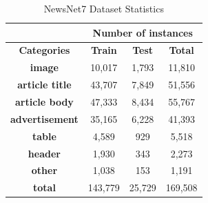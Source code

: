 \documentclass[letterpaper]{article} %
\begin{document}
\begin{table}[h]
\centering
\small
\captionsetup{font=small}
\label{NewsNet7_data_stats}

\begin{tabular}{c|ccc}
\toprule
\multicolumn{1}{l}{}   & \multicolumn{3}{c}{\textbf{Number of instances}} \\ \hline
\textbf{Categories}    & \textbf{Train}  & \textbf{Test} & \textbf{Total} \\ \hline
\textbf{image}         & 10,017           & 1,793          & 11,810          \\
\textbf{article title} & 43,707           & 7,849          & 51,556          \\
\textbf{article body}  & 47,333           & 8,434          & 55,767          \\
\textbf{advertisement} & 35,165           & 6,228          & 41,393          \\
\textbf{table}         & 4,589            & 929            & 5,518           \\
\textbf{header}        & 1,930            & 343            & 2,273           \\
\textbf{other}         & 1,038            & 153            & 1,191           \\
\textbf{total}         & 143,779          & 25,729         & 169,508         \\
\bottomrule
\end{tabular}
\caption{NewsNet7 Dataset Statistics }
\end{table}


\end{document}
